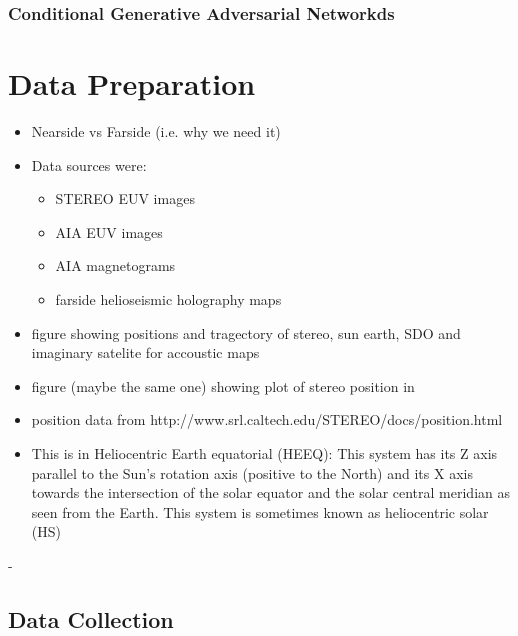 \documentclass[11pt,a4paper,onecolumn]{report}
\begin{document}
%
\subsection{Conditional Generative Adversarial Networkds}
%





%
%
%
%
\chapter{Data Preparation}
%
%
%
%




\begin{itemize}
  \item Nearside vs Farside (i.e. why we need it)
  \item Data sources were:
        \begin{itemize}
          \item STEREO EUV images
          \item AIA EUV images
          \item AIA magnetograms
          \item farside helioseismic holography maps
        \end{itemize}
  \item figure showing positions and tragectory of stereo, sun earth, SDO and
        imaginary satelite for accoustic maps
  \item figure (maybe the same one) showing plot of stereo position in
  \item position data from http://www.srl.caltech.edu/STEREO/docs/position.html
  \item This is in Heliocentric Earth equatorial (HEEQ): This system has its Z
        axis parallel to the Sun's rotation axis (positive to the North) and its X
        axis towards the intersection of the solar equator and the solar central
        meridian as seen from the Earth. This system is sometimes known as
        heliocentric solar (HS)
\end{itemize}

-

\section{Data Collection}
\end{document}
